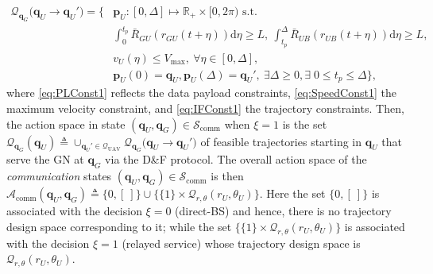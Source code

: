\documentclass[12pt, draftcls, onecolumn]{IEEEtran}
\theoremstyle{plain}
\theoremstyle{definition}
\theoremstyle{remark}
\begin{document}
\begin{align}
	\mathcal{Q}_{\mathbf q_G} \big({\mathbf q}_U\rightarrow{\mathbf q}_U'\big) = \Big\{ &\mathbf{p}_{U} : 
	[0,\Delta] \mapsto \mathbb{R}_{+} \times[0,2\pi)\text{ s.t.}\\
	&\int_{0}^{t_{p}} \bar{R}_{GU}(r_{GU}(t+\eta)) \mathrm d \eta \geq L, \ \int_{t_p}^{\Delta} \bar R_{UB}(r_{UB}(t+\eta)) \mathrm d \eta \geq L, \label{eq:PLConst1}\tag{C.1}\\
	&v_U (\eta) \leq V_{\mathrm{max}},\ \forall\eta\in[0,\Delta],\label{eq:SpeedConst1}\tag{C.2}\\
	&\mathbf{p}_{U}(0) ={\mathbf q}_U, 
	\mathbf{p}_{U}(\Delta) ={\mathbf q}_U',\label{eq:IFConst1}\ \exists \Delta \geq 0, \exists\; 0 \leq t_p \leq \Delta 
	\Big\},
	\tag{C.3}
\end{align}
where \ref{eq:PLConst1} reflects the data payload constraints, \ref{eq:SpeedConst1} the maximum velocity constraint, and \ref{eq:IFConst1} the trajectory constraints. Then, the action space in state $(\mathbf{q}_{U},\mathbf{q}_{G}){\in}\mathcal{S}_{\mathrm{comm}}$ when $\xi{=}1$ is the set $\mathcal{Q}_{\mathbf{q}_{G}}(\mathbf{q}_{U}){\triangleq}\cup_{\mathbf{q}_{U}'{\in}\mathcal{Q}_{\mathrm{UAV}}}\mathcal{Q}_{\mathbf{q}_{G}}\big(\mathbf{q}_{U}{\rightarrow}\mathbf{q}_{U}'\big)$ of feasible trajectories starting in $\mathbf{q}_{U}$ that serve the GN at $\mathbf{q}_{G}$ via the D\&F protocol. The overall action space of the \emph{communication} states $(\mathbf{q}_{U},\mathbf{q}_{G}){\in}\mathcal{S}_{\mathrm{comm}}$ is then $\mathcal{A}_{\mathrm{comm}}(\mathbf{q}_{U},\mathbf{q}_{G}){\triangleq}\{0,[\ ]\}{\cup}\{\{1\}{\times}\mathcal{Q}_{r,\theta}(r_{U},\theta_{U})\}$. Here the set $\{0, [\ ]\}$ is associated with the decision $\xi{=}0$ (direct-BS) and hence, there is no trajectory design space corresponding to it; while the set $\{\{1\}{\times}\mathcal{Q}_{r,\theta}(r_{U},\theta_{U})\}$ is associated with the decision $\xi{=}1$ (relayed service) whose trajectory design space is $\mathcal{Q}_{r,\theta}(r_{U},\theta_{U})$.
\end{document}
